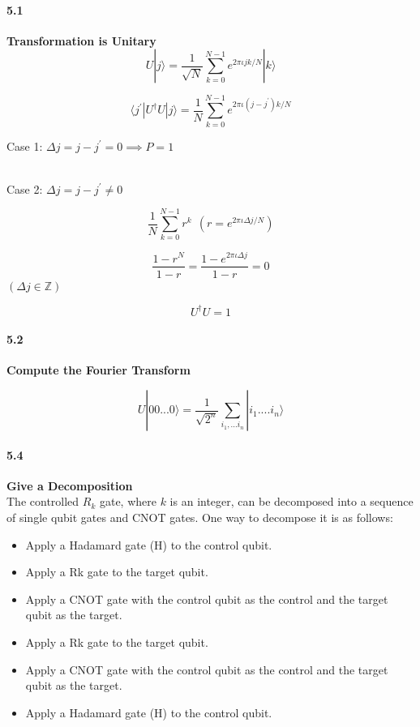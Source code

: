 \paragraph{5.1} \textbf{Transformation is Unitary}
\\

$$U|j\rangle = \frac{1}{\sqrt{N}} \sum_{k=0}^{N-1} e^{{2 \pi \iota j k}/N} |k\rangle$$

$$ \langle j^{\prime} |U^{\dagger} U | j \rangle = \frac{1}{N} \sum_{k=0}^{N-1} e^{2\pi \iota (j-j^{\prime}) k/N}$$

Case 1: $\Delta j = j - j^{\prime} = 0 \implies P = 1$

\\

Case 2: $\Delta j = j - j^{\prime} \ne 0$

$$ \frac{1}{N} \sum_{k=0}^{N-1} r^{k} \ \ (r = e^{2 \pi \iota \Delta j/N})$$

$$ \frac{1-r^N}{1-r} = \frac{1-e^{2\pi \iota \Delta j}}{1-r} = 0$$
$( \Delta j \in \mathbb{Z})$

$$ U^{\dagger} U = 1$$

\paragraph{5.2} \textbf{Compute the Fourier Transform}

$$U|00...0\rangle = \frac{1}{\sqrt{2^{n}}} \sum_{i_1,...i_n} |i_1....i_n\rangle$$

\paragraph{5.4} \textbf{Give a Decomposition}
\\

The controlled $R_k$ gate, where $k$ is an integer, can be decomposed into a sequence of single qubit gates and CNOT gates. One way to decompose it is as follows:
\begin{itemize}
    

\item  Apply a Hadamard gate (H) to the control qubit.
\item Apply a Rk gate to the target qubit.
\item Apply a CNOT gate with the control qubit as the control and the target qubit as the target.
\item Apply a Rk gate to the target qubit.
\item Apply a CNOT gate with the control qubit as the control and the target qubit as the target.
\item Apply a Hadamard gate (H) to the control qubit.

\end{itemize}

